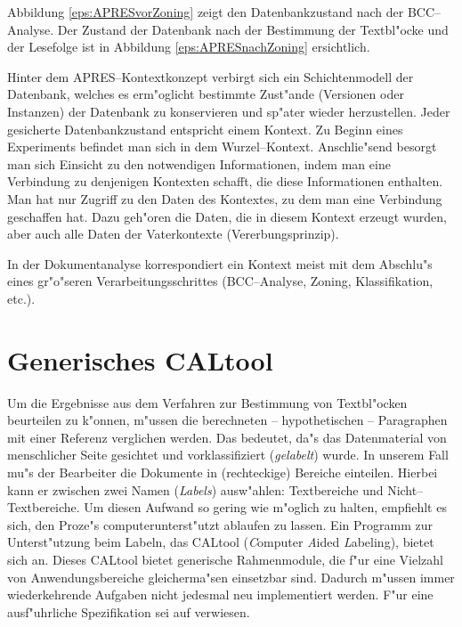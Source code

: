 
Abbildung \ref{eps:APRESvorZoning} zeigt den Datenbankzustand nach der BCC--Analyse. Der
Zustand der Datenbank nach der Bestimmung der Textbl"ocke und der Lesefolge ist in 
Abbildung \ref{eps:APRESnachZoning} ersichtlich.

Hinter dem APRES--Kontextkonzept verbirgt sich ein Schichtenmodell der Datenbank, welches es
erm"oglicht bestimmte Zust"ande (Versionen oder Instanzen) der Datenbank zu 
konservieren und sp"ater wieder herzustellen. 
Jeder gesicherte Datenbankzustand entspricht einem Kontext. 
Zu Beginn eines Experiments befindet man sich in dem Wurzel--Kontext. 
Anschlie"send besorgt man sich Einsicht 
zu den notwendigen Informationen, indem man eine Verbindung zu denjenigen Kontexten schafft, die diese 
Informationen enthalten. Man hat nur Zugriff zu den Daten des Kontextes, zu dem man eine
Verbindung geschaffen hat. Dazu geh"oren die Daten, die in diesem Kontext erzeugt wurden, aber
auch alle Daten der Vaterkontexte (Vererbungsprinzip).

In der Dokumentanalyse korrespondiert ein Kontext meist mit dem Abschlu"s eines gr"o"seren 
Verarbeitungsschrittes (BCC--Analyse, Zoning, Klassifikation, etc.).



\clearpage
\section{Generisches CALtool}
Um die Ergebnisse aus dem Verfahren zur Bestimmung von Textbl"ocken beurteilen zu k"onnen, 
m"ussen die berechneten -- hypothetischen -- Paragraphen mit einer Referenz verglichen werden.
Das bedeutet, da"s das Datenmaterial von menschlicher Seite gesichtet und
vorklassifiziert ({\em gelabelt\/}) wurde. In unserem Fall mu"s der Bearbeiter die Dokumente
in (rechteckige) Bereiche einteilen. Hierbei kann er zwischen zwei Namen ({\em Labels\/})
ausw"ahlen: Textbereiche und Nicht--Textbereiche. Um diesen Aufwand so gering wie m"oglich zu
halten, empfiehlt es sich, den Proze"s computerunterst"utzt ablaufen zu lassen. Ein
Programm zur Unterst"utzung beim Labeln, das CALtool ({\em C\/}omputer 
{\em A\/}ided {\em L\/}abeling), bietet sich an.
Dieses CALtool bietet generische Rahmenmodule, die f"ur eine Vielzahl von
Anwendungsbereiche gleicherma"sen einsetzbar sind. Dadurch m"ussen immer wiederkehrende
Aufgaben  nicht jedesmal neu implementiert werden. F"ur eine ausf"uhrliche
Spezifikation sei auf \cite{CALtool} verwiesen.

